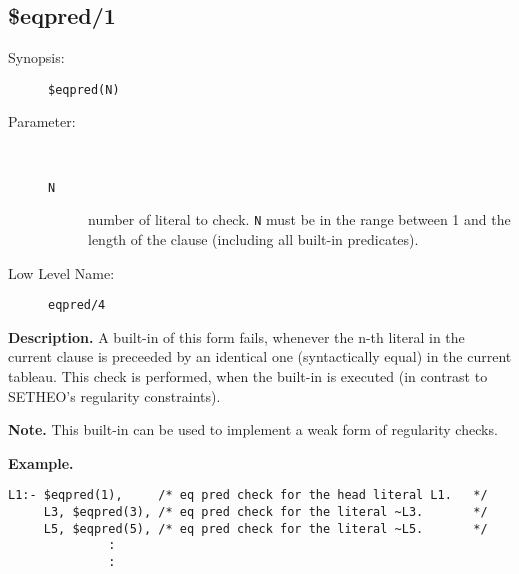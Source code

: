 %
%
%
\subsection{\$eqpred/1}

\begin{description}
\item[Synopsis:]
	{\tt \$eqpred(N)}
\item[Parameter:]\ \\[-0.5cm]
	\begin{description}
	\item[{\tt N}]
	number of literal to check. {\tt N} must be in the range
        between 1 and the length of the clause (including all built-in
	predicates).
	\end{description}
\item[Low Level Name:]
	{\tt eqpred/4}
\end{description}

\vspace*{0.5cm}
\noindent
{\bf Description.}
A built-in of this form fails, whenever the
n-th literal in the current clause is preceeded by an
identical one (syntactically equal) in the current tableau.
This check is performed, when the built-in is executed (in contrast
to SETHEO's regularity constraints).

\vspace*{0.5cm}
\noindent
{\bf Note.}
This built-in can be used to implement a weak form of
regularity checks.

\vspace*{0.5cm}
\noindent
{\bf Example.}
\begin{verbatim}
L1:- $eqpred(1),     /* eq pred check for the head literal L1.   */
     L3, $eqpred(3), /* eq pred check for the literal ~L3.       */
     L5, $eqpred(5), /* eq pred check for the literal ~L5.       */
              :
              :

\end{verbatim}


